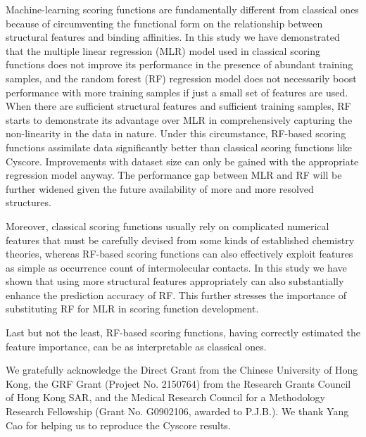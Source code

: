 \documentclass[journal=jacsat,manuscript=article]{achemso}
\begin{document}
Machine-learning scoring functions are fundamentally different from classical ones because of circumventing the functional form on the relationship between structural features and binding affinities. In this study we have demonstrated that the multiple linear regression (MLR) model used in classical scoring functions does not improve its performance in the presence of abundant training samples, and the random forest (RF) regression model does not necessarily boost performance with more training samples if just a small set of features are used. When there are sufficient structural features and sufficient training samples, RF starts to demonstrate its advantage over MLR in comprehensively capturing the non-linearity in the data in nature. Under this circumstance, RF-based scoring functions assimilate data significantly better than classical scoring functions like Cyscore. Improvements with dataset size can only be gained with the appropriate regression model anyway. The performance gap between MLR and RF will be further widened given the future availability of more and more resolved structures.

Moreover, classical scoring functions usually rely on complicated numerical features that must be carefully devised from some kinds of established chemistry theories, whereas RF-based scoring functions can also effectively exploit features as simple as occurrence count of intermolecular contacts. In this study we have shown that using more structural features appropriately can also substantially enhance the prediction accuracy of RF. This further stresses the importance of substituting RF for MLR in scoring function development.

Last but not the least, RF-based scoring functions, having correctly estimated the feature importance, can be as interpretable as classical ones.

\begin{acknowledgement}

We gratefully acknowledge the Direct Grant from the Chinese University of Hong Kong, the GRF Grant (Project No. 2150764) from the Research Grants Council of Hong Kong SAR, and the Medical Research Council for a Methodology Research Fellowship (Grant No. G0902106, awarded to P.J.B.). We thank Yang Cao for helping us to reproduce the Cyscore results.

\end{acknowledgement}
\end{document}
